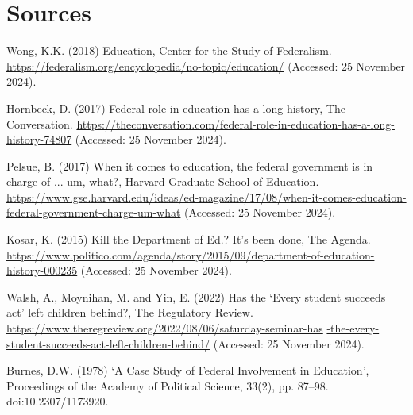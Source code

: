 \documentclass[11pt]{extarticle}
\begin{document}
\section{Sources}
\begin{hangparas}{.25in}{1}
Wong, K.K. (2018) Education, Center for the Study of Federalism. \url{https://federalism.org/encyclopedia/no-topic/education/} (Accessed: 25 November 2024).
\end{hangparas}
\par \vspace{0.5cm}
\begin{hangparas}{.25in}{1}
Hornbeck, D. (2017) Federal role in education has a long history, The Conversation. \url{https://theconversation.com/federal-role-in-education-has-a-long-history-74807} (Accessed: 25 November 2024). 
\end{hangparas}
\par \vspace{0.5cm}
\begin{hangparas}{.25in}{1}
Pelsue, B. (2017) When it comes to education, the federal government is in charge of ... um, what?, Harvard Graduate School of Education. \url{https://www.gse.harvard.edu/ideas/ed-magazine/17/08/when-it-comes-education-federal-government-charge-um-what} (Accessed: 25 November 2024). 
\end{hangparas}
\par \vspace{0.5cm}
\begin{hangparas}{.25in}{1}
Kosar, K. (2015) Kill the Department of Ed.? It’s been done, The Agenda. \url{https://www.politico.com/agenda/story/2015/09/department-of-education-history-000235} (Accessed: 25 November 2024). 
\end{hangparas}
\par \vspace{0.5cm}
\begin{hangparas}{.25in}{1}
Walsh, A., Moynihan, M. and Yin, E. (2022) Has the ‘Every student succeeds act’ left children behind?, The Regulatory Review. \url{https://www.theregreview.org/2022/08/06/saturday-seminar-has} \url{-the-every-student-succeeds-act-left-children-behind/} (Accessed: 25 November 2024). 
\end{hangparas}
\par \vspace{0.5cm}
\begin{hangparas}{.25in}{1}
Burnes, D.W. (1978) ‘A Case Study of Federal Involvement in Education’, Proceedings of the Academy of Political Science, 33(2), pp. 87–98. doi:10.2307/1173920. 
\end{hangparas}
\end{document}
